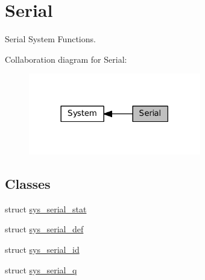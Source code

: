 \hypertarget{group__SYSTEM__SERIAL__COMM}{}\section{Serial}
\label{group__SYSTEM__SERIAL__COMM}


Serial System Functions.  


Collaboration diagram for Serial\+:\nopagebreak
\begin{figure}[H]
\begin{center}
\leavevmode
\includegraphics[width=213pt]{group__SYSTEM__SERIAL__COMM}
\end{center}
\end{figure}
\subsection*{Classes}
\begin{DoxyCompactItemize}
\item 
struct \hyperlink{structsys__serial__stat}{sys\+\_\+serial\+\_\+stat}
\item 
struct \hyperlink{structsys__serial__def}{sys\+\_\+serial\+\_\+def}
\item 
struct \hyperlink{structsys__serial__id}{sys\+\_\+serial\+\_\+id}
\item 
struct \hyperlink{structsys__serial__q}{sys\+\_\+serial\+\_\+q}
\end{DoxyCompactItemize}
